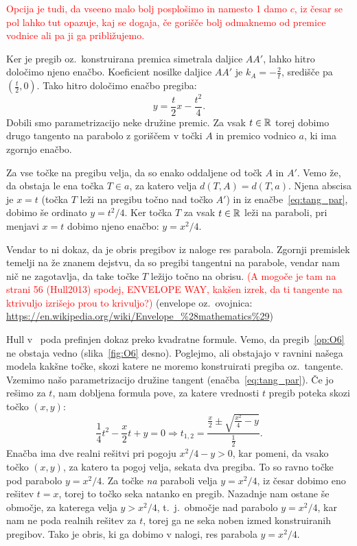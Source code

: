 \textcolor{red}{Opcija je tudi, da vseeno malo bolj posplošimo in namesto 1 damo $c$, iz česar se pol lahko tut opazuje, kaj se dogaja, če gorišče bolj odmaknemo od premice vodnice ali pa ji ga približujemo.}

Ker je pregib oz.\ konstruirana premica simetrala daljice $AA'$, lahko hitro določimo njeno enačbo. Koeficient nosilke daljice $AA'$ je $k_A = -\frac{2}{t}$, središče pa $(\frac{t}{2}, 0)$. Tako hitro določimo enačbo pregiba:
\begin{equation}
    y = \frac{t}{2} x - \frac{t^2}{4}.
    \label{eq:tang_par}
\end{equation}
Dobili smo parametrizacijo neke družine premic. Za vsak $t \in \mathbb R$ torej dobimo drugo tangento na parabolo z goriščem v točki $A$ in premico vodnico $a$, ki ima zgornjo enačbo.

Za vse točke na pregibu velja, da so enako oddaljene od točk $A$ in $A'$. Vemo že, da obstaja le ena točka $T \in a$, za katero velja $d(T, A) = d(T, a)$. Njena abscisa je $x = t$ (točka $T$ leži na pregibu točno nad točko $A'$) in iz enačbe~\ref{eq:tang_par}, dobimo še ordinato $y = t^2 / 4$. Ker točka $T$ za vsak $t \in \mathbb R$ leži na paraboli, pri menjavi $x = t$ dobimo njeno enačbo: $y = x^2 / 4$.

Vendar to ni dokaz, da je obris pregibov iz naloge res parabola. Zgornji premislek temelji na že znanem dejstvu, da so pregibi tangentni na parabole, vendar nam nič ne zagotavlja, da take točke $T$ ležijo točno na obrisu. \textcolor{red}{(A mogoče je tam na strani 56 (Hull2013) spodej, ENVELOPE WAY, kakšen izrek, da ti tangente na ktrivuljo izrišejo prou to krivuljo?)} (envelope oz.\ ovojnica: \url{https://en.wikipedia.org/wiki/Envelope_%28mathematics%29})

Hull v~\cite[str.\ 55--56]{hull2013} poda prefinjen dokaz preko kvadratne formule. Vemo, da pregib~\ref{op:O6} ne obstaja vedno (slika~\ref{fig:O6} desno). Poglejmo, ali obstajajo v ravnini našega modela kakšne točke, skozi katere ne moremo konstruirati pregiba oz.\ tangente. Vzemimo našo parametrizacijo družine tangent (enačba~\ref{eq:tang_par}). Če jo rešimo za $t$, nam dobljena formula pove, za katere vrednosti $t$ pregib poteka skozi točko $(x, y)$:
$$ \frac{1}{4}t^2 - \frac{x}{2}t + y = 0 \Rightarrow t_{1,2} = \frac{\frac{x}{2} \pm \sqrt{\frac{x^2}{4} - y}}{\frac{1}{2}}.$$
Enačba ima dve realni rešitvi pri pogoju $x^2 / 4 - y > 0$, kar pomeni, da vsako točko $(x, y)$, za katero ta pogoj velja, sekata dva pregiba. To so ravno točke pod parabolo $y = x^2 / 4$. Za točke \emph{na} paraboli velja $y = x^2 / 4$, iz česar dobimo eno rešitev $t = x$, torej to točko seka natanko en pregib. Nazadnje nam ostane še območje, za katerega velja $y > x^2 / 4$, t.\ j.\ območje nad parabolo $y = x^2 / 4$, kar nam ne poda realnih rešitev za $t$, torej ga ne seka noben izmed konstruiranih pregibov. Tako je obris, ki ga dobimo v nalogi, res parabola $y = x^2 / 4$.

